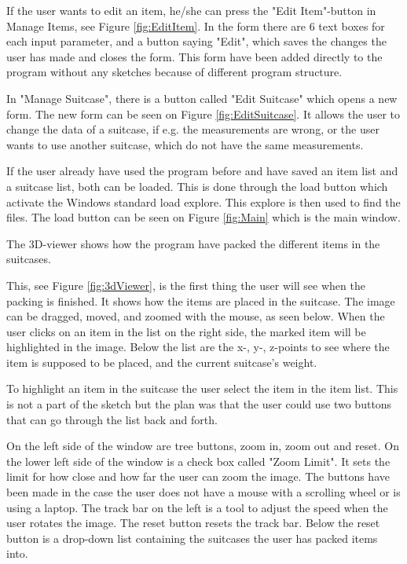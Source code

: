 If the user wants to edit an item, he/she can press the "Edit Item"-button in Manage Items, see Figure \ref{fig:EditItem}. In the form there are 6 text boxes for each input parameter, and a button saying "Edit", which saves the changes the user has made and closes the form. This form have been added directly to the program without any sketches because of different program structure.

In "Manage Suitcase", there is a button called "Edit Suitcase" which opens a new form. The new form can be seen on Figure \ref{fig:EditSuitcase}. It allows the user to change the data of a suitcase, if e.g. the measurements are wrong, or the user wants to use another suitcase, which do not have the same measurements.

If the user already have used the program before and have saved an item list and a suitcase list, both can be loaded. This is done through the load button which activate the Windows standard load explore. This explore is then used to find the files. The load button can be seen on Figure \ref{fig:Main} which is the main window.

The 3D-viewer shows how the program have packed the different items in the suitcases.


This, see Figure \ref{fig:3dViewer}, is the first thing the user will see when the packing is finished. It shows how the items are placed in the suitcase.
The image can be dragged, moved, and zoomed with the mouse, as seen below. When the user clicks on an item in the list on the right side, the marked item will be highlighted in the image. Below the list are the x-, y-, z-points to see where the item is supposed to be placed, and the current suitcase's weight.

To highlight an item in the suitcase the user select the item in the item list. This is not a part of the sketch but the plan was that the user could use two buttons that can go through the list back and forth.

On the left side of the window are tree buttons, zoom in, zoom out and reset. On the lower left side of the window is a check box called "Zoom Limit". It sets the limit for how close and how far the user can zoom the image. The buttons have been made in the case the user does not have a mouse with a scrolling wheel or is using a laptop. The track bar on the left is a tool to adjust the speed when the user rotates the image. The reset button resets the track bar. Below the reset button is a drop-down list containing the suitcases the user has packed items into.

